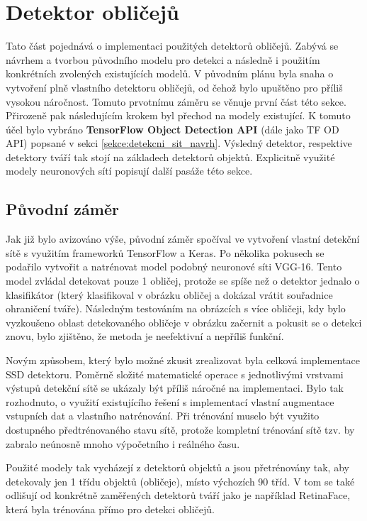 \section{Detektor obličejů}
\label{sekce:detektor_obliceju_implementace}
Tato část pojednává o implementaci použitých detektorů obličejů. Zabývá se návrhem a tvorbou původního modelu pro detekci a následně i použitím konkrétních zvolených existujících modelů. V původním plánu byla snaha o vytvoření plně vlastního detektoru obličejů, od čehož bylo upuštěno pro příliš vysokou náročnost. Tomuto prvotnímu záměru se věnuje první část této sekce. Přirozeně pak následujícím krokem byl přechod na modely existující. K tomuto účel bylo vybráno \textbf{TensorFlow Object Detection API} (dále jako TF OD API) popsané v sekci \ref{sekce:detekcni_sit_navrh}. Výsledný detektor, respektive detektory tváří tak stojí na základech detektorů objektů. Explicitně využité modely neuronových sítí popisují další pasáže této sekce.

\subsection*{Původní záměr}
Jak již bylo avizováno výše, původní záměr spočíval ve vytvoření vlastní detekční sítě s využitím frameworků TensorFlow a Keras. Po několika pokusech se podařilo vytvořit a natrénovat model podobný neuronové síti VGG-16. Tento model zvládal detekovat pouze 1 obličej, protože se spíše než o detektor jednalo o klasifikátor (který klasifikoval v obrázku obličej a dokázal vrátit souřadnice ohraničení tváře). Následným testováním na obrázcích s více obličeji, kdy bylo vyzkoušeno oblast detekovaného obličeje v obrázku začernit a pokusit se o detekci znovu, bylo zjištěno, že metoda je neefektivní a nepříliš funkční.

Novým způsobem, který bylo možné zkusit zrealizovat byla celková implementace SSD detektoru. Poměrně složité matematické operace s jednotlivými vrstvami výstupů detekční sítě se ukázaly být příliš náročné na implementaci. Bylo tak rozhodnuto, o využití existujícího řešení s implementací vlastní augmentace vstupních dat a vlastního natrénování. Při trénování muselo být využito dostupného předtrénovaného stavu sítě, protože kompletní trénování sítě tzv.  by zabralo neúnosně mnoho výpočetního i reálného času.

Použité modely tak vycházejí z detektorů objektů a jsou přetrénovány tak, aby detekovaly jen 1 třídu objektů (obličeje), místo výchozích 90 tříd. V tom se také odlišují od konkrétně zaměřených detektorů tváří jako je například RetinaFace, která byla trénována přímo pro detekci obličejů.

